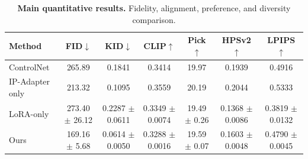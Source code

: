 \begin{table}[t]
\centering
\small
\caption{\textbf{Main quantitative results.} Fidelity, alignment, preference, and diversity comparison.}
\label{tab:main-quantitative-results}
\begin{tabular}{lcccccc}
\toprule
\textbf{Method} & \textbf{FID$\downarrow$} & \textbf{KID$\downarrow$} & \textbf{CLIP$\uparrow$} & \textbf{Pick$\uparrow$} & \textbf{HPSv2$\uparrow$} & \textbf{LPIPS$\uparrow$} \\
\midrule
ControlNet & 265.89 & 0.1841 & 0.3414 & 19.97 & 0.1939 & 0.4916 \\
IP-Adapter only & 213.32 & 0.1095 & 0.3559 & 20.19 & 0.2044 & 0.5333 \\
LoRA-only & 273.40 $\pm$ 26.12 & 0.2287 $\pm$ 0.0611 & 0.3349 $\pm$ 0.0074 & 19.49 $\pm$ 0.26 & 0.1368 $\pm$ 0.0086 & 0.3819 $\pm$ 0.0132 \\
Ours & 169.16 $\pm$ 5.68 & 0.0614 $\pm$ 0.0050 & 0.3288 $\pm$ 0.0016 & 19.59 $\pm$ 0.07 & 0.1603 $\pm$ 0.0048 & 0.4790 $\pm$ 0.0045 \\
\bottomrule
\end{tabular}
\end{table}
